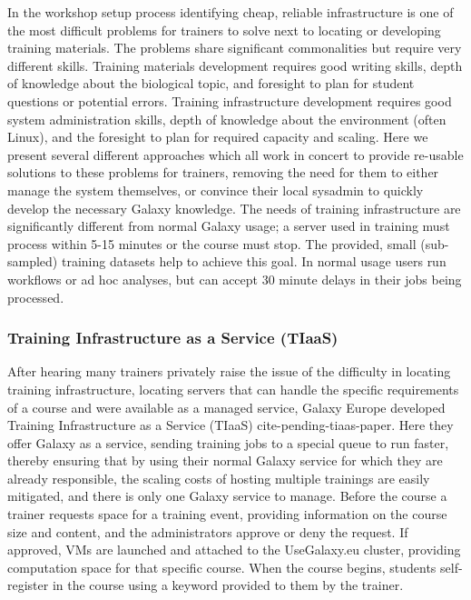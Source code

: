 \documentclass[10pt,letterpaper]{article}
\begin{document}
In the workshop setup process identifying cheap, reliable infrastructure is one of the most difficult problems for trainers to solve next to locating or developing training materials.
The problems share significant commonalities but require very different skills.
Training materials development requires good writing skills, depth of knowledge about the biological topic, and foresight to plan for student questions or potential errors.
Training infrastructure development requires good system administration skills, depth of knowledge about the environment (often Linux), and the foresight to plan for required capacity and scaling.
Here we present several different approaches which all work in concert to provide re-usable solutions to these problems for trainers, removing the need for them to either manage the system themselves, or convince their local sysadmin to quickly develop the necessary Galaxy knowledge.
The needs of training infrastructure are significantly different from normal Galaxy usage; a server used in training must process within 5-15 minutes or the course must stop.
The provided, small (sub-sampled) training datasets help to achieve this goal.
In normal usage users run workflows or ad hoc analyses, but can accept 30 minute delays in their jobs being processed.

\subsubsection*{Training Infrastructure as a Service (TIaaS)}
After hearing many trainers privately raise the issue of the difficulty in locating training infrastructure, locating servers that can handle the specific requirements of a course and were available as a managed service, Galaxy Europe developed Training Infrastructure as a Service (TIaaS) {cite-pending-tiaas-paper}.
Here they offer Galaxy as a service, sending training jobs to a special queue to run faster, thereby ensuring that by using their normal Galaxy service for which they are already responsible, the scaling costs of hosting multiple trainings are easily mitigated, and there is only one Galaxy service to manage.
Before the course a trainer requests space for a training event, providing information on the course size and content, and the administrators approve or deny the request.
If approved, VMs are launched and attached to the UseGalaxy.eu cluster, providing computation space for that specific course.
When the course begins, students self-register in the course using a keyword provided to them by the trainer.
\end{document}

